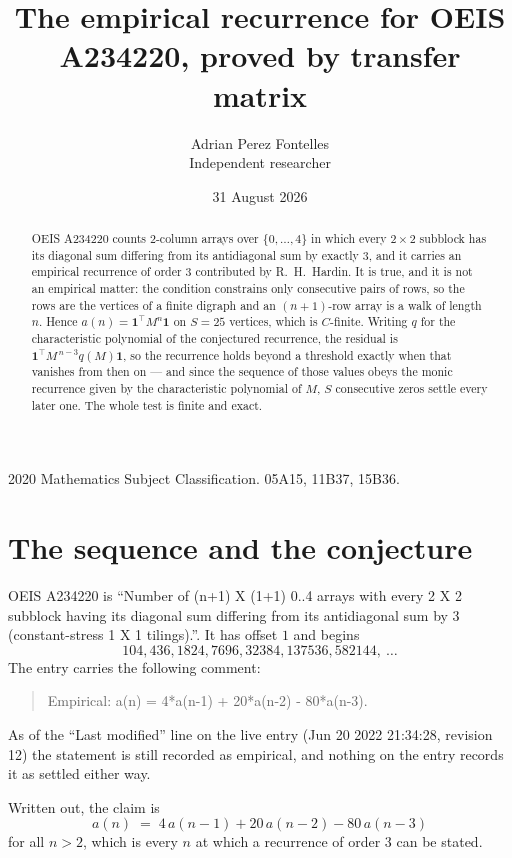 \documentclass[11pt,a4paper]{article}
\title{The empirical recurrence for OEIS A234220, proved by transfer matrix}
\author{Adrian Perez Fontelles\\ \small Independent researcher}
\date{31 August 2026}
\theoremstyle{plain}
\theoremstyle{definition}
\begin{document}
\maketitle

\begin{abstract}
OEIS A234220 counts $2$-column arrays over $\{0,\dots,4\}$ in which every
$2\times2$ subblock has its diagonal sum differing from its antidiagonal sum by
exactly $3$, and it
carries an empirical recurrence of order $3$ contributed by R.~H.~Hardin. It is true,
and it is not an empirical matter: the condition constrains only consecutive pairs of rows,
so the rows are the vertices of a finite digraph and an $(n+1)$-row array is a walk of
length $n$. Hence $a(n)=\mathbf{1}^{\!\top}M^{n}\mathbf{1}$ on $S=25$ vertices, which
is $C$-finite. Writing $q$ for the characteristic polynomial of the conjectured recurrence,
the residual is $\mathbf{1}^{\!\top}M^{\,n-3}q(M)\mathbf{1}$, so the recurrence
holds beyond a threshold exactly when that vanishes from then on --- and since the sequence
of those values obeys the monic recurrence given by the characteristic polynomial of $M$,
$S$ consecutive zeros settle every later one. The whole test is finite and exact.
\end{abstract}

\noindent\small 2020 Mathematics Subject Classification. 05A15, 11B37, 15B36.\normalsize

\section{The sequence and the conjecture}

OEIS A234220 is ``Number of (n+1) X (1+1) 0..4 arrays with every 2 X 2 subblock having its diagonal sum differing from its antidiagonal sum by 3 (constant-stress 1 X 1 tilings).''. It has offset
$1$ and begins
\[
104, 436, 1824, 7696, 32384, 137536, 582144,\ \dots
\]
The entry carries the following comment:
\begin{quote}\small
Empirical: a(n) = 4*a(n-1) + 20*a(n-2) - 80*a(n-3).
\end{quote}
As of the ``Last modified'' line on the live entry (Jun 20 2022 21:34:28, revision 12) the statement is
still recorded as empirical, and nothing on the entry records it as settled either way.

Written out, the claim is
\begin{equation}\label{eq:conj}
a(n)\;=\;4\,a(n-1) + 20\,a(n-2) - 80\,a(n-3)
\end{equation}
for all $n>2$, which is every $n$ at which a recurrence of order $3$ can be
stated.
\end{document}

